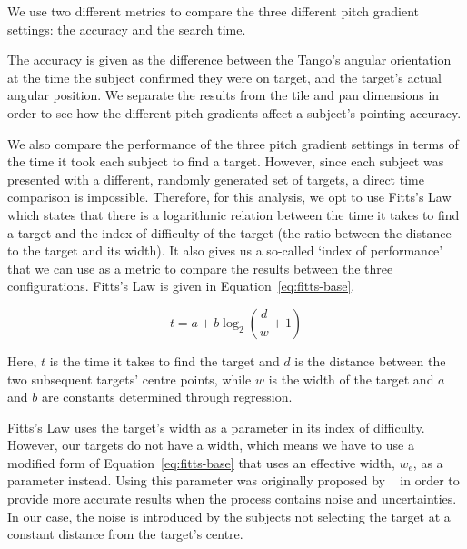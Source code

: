 \documentclass[format=sigconf, review=true, screen=true, anonymous=true]{acmart}
\begin{document}
We use two different metrics to compare the three different pitch gradient settings: the accuracy and the search time. 

The accuracy is given as the difference between the Tango's angular orientation at the time the subject confirmed they were on target, and the target's actual angular position. We separate the results from the tile and pan dimensions in order to see how the different pitch gradients affect a subject's pointing accuracy. 


We also compare the performance of the three pitch gradient settings in terms of the time it took each subject to find a target. However, since each subject was presented with a different, randomly generated set of targets, a direct time comparison is impossible. Therefore, for this analysis, we opt to use Fitts's Law~\cite{fitts1954information} which states that there is a logarithmic relation between the time it takes to find a target and the index of difficulty of the target (the ratio between the distance to the target and its width). It also gives us a so-called `index of performance' that we can use as a metric to compare the results between the three configurations. Fitts's Law is given in Equation~\ref{eq:fitts-base}. 

\begin{equation}
  \label{eq:fitts-base}
  t = a + b\log_2\left(\frac{d}{w} + 1\right)
\end{equation}

Here, $t$ is the time it takes to find the target and $d$ is the distance between the two subsequent targets' centre points, while $w$ is the width of the target and $a$ and $b$ are constants determined through regression.

Fitts's Law uses the target's width as a parameter in its index of difficulty. However, our targets do not have a width, which means we have to use a modified form of Equation~\ref{eq:fitts-base} that uses an effective width, $w_e$, as a parameter instead. Using this parameter was originally proposed by \citeauthor{mackenzie1992fitts}~\cite{mackenzie1992fitts} in order to provide more accurate results when the process contains noise and uncertainties. In our case, the noise is introduced by the subjects not selecting the target at a constant distance from the target's centre. 
\end{document}
